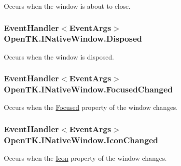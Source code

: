 Occurs when the window is about to close. 

\hypertarget{interface_open_t_k_1_1_i_native_window_a7e983e4b600c3e3805a693957f4b8a75}{
\subsubsection[{Disposed}]{\setlength{\rightskip}{0pt plus 5cm}Event\-Handler$<$Event\-Args$>$ Open\-T\-K.\-I\-Native\-Window.\-Disposed}}\label{interface_open_t_k_1_1_i_native_window_a7e983e4b600c3e3805a693957f4b8a75}


Occurs when the window is disposed. 

\hypertarget{interface_open_t_k_1_1_i_native_window_ae0a2b1803d348c1a23cddcf384ee4008}{
\subsubsection[{Focused\-Changed}]{\setlength{\rightskip}{0pt plus 5cm}Event\-Handler$<$Event\-Args$>$ Open\-T\-K.\-I\-Native\-Window.\-Focused\-Changed}}\label{interface_open_t_k_1_1_i_native_window_ae0a2b1803d348c1a23cddcf384ee4008}


Occurs when the \hyperlink{interface_open_t_k_1_1_i_native_window_aaa2ef631c8bd4bcbef3374dfaeb50299}{Focused} property of the window changes. 

\hypertarget{interface_open_t_k_1_1_i_native_window_a968bcf8310e87cee07e85eb9629da874}{
\subsubsection[{Icon\-Changed}]{\setlength{\rightskip}{0pt plus 5cm}Event\-Handler$<$Event\-Args$>$ Open\-T\-K.\-I\-Native\-Window.\-Icon\-Changed}}\label{interface_open_t_k_1_1_i_native_window_a968bcf8310e87cee07e85eb9629da874}


Occurs when the \hyperlink{interface_open_t_k_1_1_i_native_window_a16cffc51a5dd62c9d9dbf9a089620754}{Icon} property of the window changes. 

